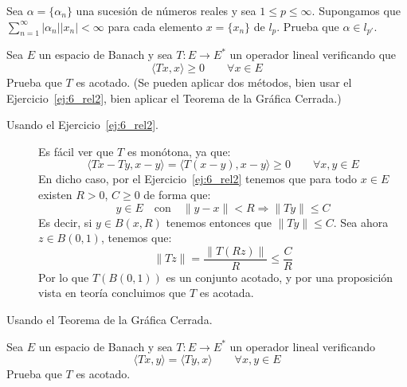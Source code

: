 \begin{ejercicio}
    Sea $\alpha = \{\alpha_n\}$ una sucesión de números reales y sea $1\leq p \leq \infty$. Supongamos que $\sum_{n=1}^{\infty} |\alpha_n||x_n| < \infty$ para cada elemento $x=\{x_n\}$ de $l_p$. Prueba que $\alpha\in l_{p'}$.
\end{ejercicio}

\begin{ejercicio}
    Sea $E$ un espacio de Banach y sea $T:E\to E^\ast$ un operador lineal verificando que
    \begin{equation*}
        \langle Tx, x \rangle \geq 0 \qquad \forall x\in E
    \end{equation*}
    Prueba que $T$ es acotado.\newline
    (Se pueden aplicar dos métodos, bien usar el Ejercicio~\ref{ej:6_rel2}, bien aplicar el Teorema de la Gráfica Cerrada.)

    \begin{description}
        \item [Usando el Ejercicio~\ref{ej:6_rel2}.] Es fácil ver que $T$ es monótona, ya que:
            \begin{equation*}
                \langle Tx-Ty,x-y \rangle  = \langle T(x-y),x-y \rangle \geq 0 \qquad \forall x,y\in E
            \end{equation*}
            En dicho caso, por el Ejercicio~\ref{ej:6_rel2} tenemos que para todo $x\in E$ existen $R>0$, $C\geq 0$ de forma que:
            \begin{equation*}
                y\in E \quad \text{con}\quad \|y-x\|<R \Longrightarrow \|Ty\| \leq C
            \end{equation*}
            Es decir, si $y\in B(x,R)$ tenemos entonces que $\|Ty\| \leq C$. Sea ahora $z\in B(0,1)$, tenemos que:
            \begin{equation*}
                \|Tz\| = \dfrac{\|T(Rz)\|}{R} \leq \dfrac{C}{R}
            \end{equation*}
            Por lo que $T(B(0,1))$ es un conjunto acotado, y por una proposición vista en teoría concluimos que $T$ es acotada.
        \item [Usando el Teorema de la Gráfica Cerrada.]  %
    \end{description}
\end{ejercicio}

\begin{ejercicio}
    Sea $E$ un espacio de Banach y sea $T:E\to E^\ast$ un operador lineal verificando 
    \begin{equation*}
        \langle Tx,y \rangle  = \langle Ty,x \rangle  \qquad \forall x,y\in E
    \end{equation*}
    Prueba que $T$ es acotado.
\end{ejercicio}

